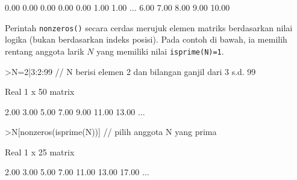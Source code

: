 \documentclass[a4paper,11pt,oneside,enabledeprecatedfontcommands]{scrbook}
\newenvironment{eulernotebook}{}{}
\newenvironment{eulercomment}{\par\medskip\noindent}{\par\medskip}
\begin{document}
\begin{eulernotebook}
\begin{euleroutput}
       0.00        0.00        0.00        0.00        0.00        1.00        1.00     ...
       6.00        7.00        8.00        9.00       10.00 
\end{euleroutput}
\begin{eulercomment}
Perintah \texttt{nonzeros()} secara cerdas merujuk elemen matriks berdasarkan nilai logika (bukan berdasarkan indeks posisi). Pada contoh di bawah, ia memilih rentang anggota larik $N$ yang memiliki nilai \texttt{isprime(N)=1}.
\end{eulercomment}
\begin{eulerprompt}
>N=2|3:2:99 // N berisi elemen 2 dan bilangan ganjil dari 3 s.d. 99
\end{eulerprompt}
\begin{euleroutput}
Real 1 x 50 matrix

       2.00        3.00        5.00        7.00        9.00       11.00       13.00     ...
\end{euleroutput}
\begin{eulerprompt}
>N[nonzeros(isprime(N))] // pilih anggota N yang prima
\end{eulerprompt}
\begin{euleroutput}
Real 1 x 25 matrix

       2.00        3.00        5.00        7.00       11.00       13.00       17.00     ...
\end{euleroutput}


\end{eulernotebook}
\end{document}
